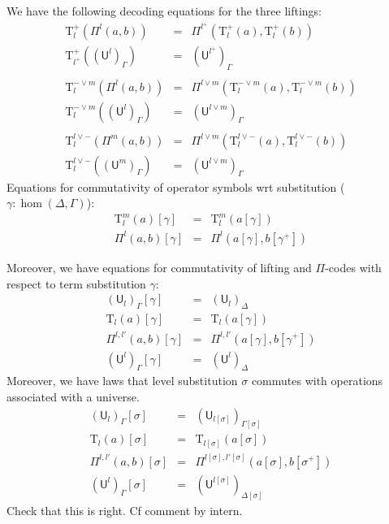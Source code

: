 \documentclass[11pt,a4paper]{article}
\theoremstyle{definition}
\newcommand{\UU}{\mathsf{U}}
\def\UU{\mathsf{U}}
\newcommand{\N}{\mathsf{N}}
\def\U{\mathsf{U}}
\newcommand{\Ta}{\mathrm{T}}
\begin{document}
We have the following decoding equations for the three liftings:
\begin{eqnarray*}
\Ta^+_{l}(\Pi^{l}(a,b)) &=& \Pi^{l^+}(\Ta^+_l(a),\Ta^+_l(b))\\
\Ta^+_{l^+}((\UU^l)_\Gamma) &=& (\UU^{l^+})_\Gamma\\
&&\\
\Ta^{-\vee m}_{l}(\Pi^{l}(a,b)) &=& \Pi^{l \vee m}(\Ta^{-\vee m}_l(a),\Ta^{-\vee m}_l(b))\\
\Ta^{-\vee m}_{l}((\UU^l)_\Gamma) &=& (\UU^{l\vee m})_\Gamma\\
&&\\
\Ta^{l \vee -}_{l}(\Pi^{m}(a,b)) &=& \Pi^{l \vee m}(\Ta^{l \vee -}_l(a),\Ta^{l \vee -}_l(b))\\
\Ta^{l \vee -}_{l}((\UU^m)_\Gamma) &=& (\UU^{l\vee m})_\Gamma\end{eqnarray*}
Equations for commutativity of operator symbols wrt substitution ($\gamma : \hom(\Delta,\Gamma)$):
\begin{eqnarray*}
\Ta^m_l(a) [ \gamma ] &=& \Ta^m_l(a[ \gamma ] )\\
\Pi^{l}(a,b)[ \gamma ] &=& \Pi^{l}(a [ \gamma ], b[ \gamma^+ ])
\end{eqnarray*}


Moreover, we have equations for commutativity of lifting and $\Pi$-codes with respect to term substitution $\gamma$:
 \begin{eqnarray*}
(\U_l)_\Gamma [ \gamma ] &=& (\U_l)_\Delta\\
\Ta_l(a) [ \gamma ] &=& \Ta_l(a[ \gamma ] )\\
\Pi^{l,l'}(a,b)[ \gamma ] &=& \Pi^{l,l'}(a [ \gamma ], b[ \gamma^+ ])\\
(\UU^l)_\Gamma[ \gamma ] &=&(\UU^l)_\Delta
\end{eqnarray*}
Moreover, we have laws that level substitution $\sigma$ commutes with operations associated with a universe.
 \begin{eqnarray*}
 (\U_{l})_\Gamma[\sigma] &=& (\U_{l[\sigma]})_{\Gamma[\sigma]}\\
 \Ta_l(a) [ \sigma ] &=& \Ta_{l[\sigma]}(a[ \sigma ] )\\
\Pi^{l,l'}(a,b)[ \sigma ] &=& \Pi^{l[ \sigma ] ,l'[ \sigma ] }(a [ \sigma ], b[ \sigma^+ ])\\
(\UU^l)_\Gamma[ \sigma ] &=&(\UU^{l[ \sigma ]} )_{\Delta[ \sigma ]} 
 \end{eqnarray*}
Check that this is right. Cf comment by intern.
\end{document}
